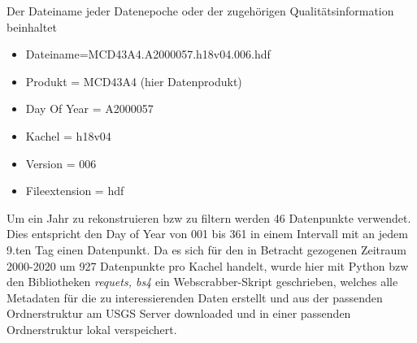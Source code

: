 \documentclass[11pt]{report}
\begin{document}
Der Dateiname jeder Datenepoche oder der zugehörigen Qualitätsinformation beinhaltet 
\begin{itemize}
\item Dateiname=MCD43A4.A2000057.h18v04.006.hdf 
\item Produkt = MCD43A4 (hier Datenprodukt)
\item Day Of Year = A2000057 
\item Kachel = h18v04
\item Version = 006
\item Fileextension = hdf
\end{itemize}
Um ein Jahr zu rekonstruieren bzw zu filtern werden 46 Datenpunkte verwendet. Dies entspricht den Day of Year von 001 bis 361 in einem Intervall mit an jedem 9.ten Tag einen Datenpunkt. Da es sich für den in Betracht gezogenen Zeitraum 2000-2020 um 927 Datenpunkte pro Kachel handelt, wurde hier mit Python bzw den Bibliotheken \emph{requets, bs4} ein Webscrabber-Skript geschrieben, welches alle Metadaten für die zu interessierenden Daten erstellt und aus der passenden Ordnerstruktur am USGS Server downloaded und in einer passenden Ordnerstruktur lokal verspeichert.
\end{document}
